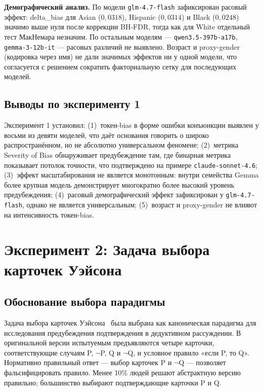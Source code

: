 \textbf{Демографический анализ.} По модели \texttt{glm-4.7-flash} зафиксирован расовый эффект: delta\_bias для Asian ($0{,}0318$), Hispanic ($0{,}0314$) и Black ($0{,}0248$) значимо выше нуля после коррекции BH-FDR, тогда как для White отдельный тест МакНемара незначим. По остальным моделям --- \texttt{qwen3.5-397b-a17b}, \texttt{gemma-3-12b-it} --- расовых различий не выявлено. Возраст и proxy-gender (кодировка через имя) не дали значимых эффектов ни у одной модели, что согласуется с решением сократить факториальную сетку для последующих моделей.

\subsection{Выводы по эксперименту 1}

Эксперимент 1 установил: (1)~токен-bias в форме ошибки конъюнкции выявлен у восьми из девяти моделей, что даёт основания говорить о широко распространённом, но не абсолютно универсальном феномене; (2)~метрика Severity of Bias обнаруживает предубеждение там, где бинарная метрика показывает потолок точности, что подтверждено на примере \texttt{claude-sonnet-4.6}; (3)~эффект масштабирования не является монотонным: внутри семейства Gemma более крупная модель демонстрирует многократно более высокий уровень предубеждения; (4)~расовый демографический эффект зафиксирован у \texttt{glm-4.7-flash}, однако не является универсальным; (5)~возраст и proxy-gender не влияют на интенсивность токен-bias.

\section{Эксперимент 2: Задача выбора карточек Уэйсона}

\subsection{Обоснование выбора парадигмы}

Задача выбора карточек Уэйсона~\cite{wason1966reasoning} была выбрана как каноническая парадигма для исследования предубеждения подтверждения в дедуктивном рассуждении. В оригинальной версии испытуемым предъявляются четыре карточки, соответствующие случаям P, $\lnot$P, Q и $\lnot$Q, и условное правило «если P, то Q». Нормативно правильный ответ --- выбор карточек P и $\lnot$Q --- позволяет фальсифицировать правило. Менее 10\% людей решают абстрактную версию правильно; большинство выбирают подтверждающие карточки P и Q.

